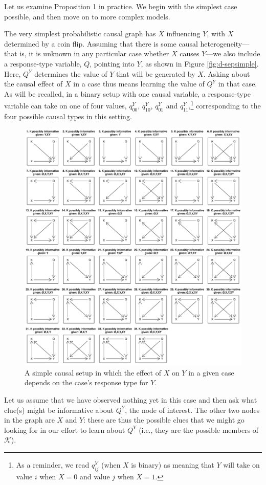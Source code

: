 \documentclass[12pt,]{book}
\let\rmarkdownfootnote\footnote%
\def\footnote{\protect\rmarkdownfootnote}
\begin{document}
Let us examine Proposition 1 in practice. We begin with the simplest case possible, and then move on to more complex models.

The very simplest probabilistic causal graph has \(X\) influencing \(Y\), with \(X\) determined by a coin flip. Assuming that there is some causal heterogeneity---that is, it is unknown in any particular case whether \(X\) causes \(Y\)---we also include a response-type variable, \(Q\), pointing into \(Y\), as shown in Figure \ref{fig:d-sepsimple}. Here, \(Q^Y\) determines the value of \(Y\) that will be generated by \(X\). Asking about the causal effect of \(X\) in a case thus means learning the value of \(Q^Y\) in that case. As will be recalled, in a binary setup with one causal variable, a response-type variable can take on one of four values, \(q^Y_{00}\), \(q^Y_{10}\), \(q^Y_{01}\) and \(q^Y_{11}\),\footnote{As a reminder, we read \(q^Y_{ij}\) (when \(X\) is binary) as meaning that \(Y\) will take on value \(i\) when \(X=0\) and value \(j\) when \(X=1\).} corresponding to the four possible causal types in this setting.

\begin{figure}

{\centering \includegraphics[width=.5\textwidth]{ii_files/figure-latex/unnamed-chunk-33-1} 

}

\caption{\label{fig:d-sepsimple} A simple causal setup in which the effect of $X$ on $Y$ in a given case depends on the case's response type for $Y$.}\label{fig:unnamed-chunk-33}
\end{figure}

Let us assume that we have observed nothing yet in this case and then ask what clue(s) might be informative about \(Q^Y\), the node of interest. The other two nodes in the graph are \(X\) and \(Y\): these are thus the possible clues that we might go looking for in our effort to learn about \(Q^Y\) (i.e., they are the possible members of \(\mathcal K\)).
\end{document}
